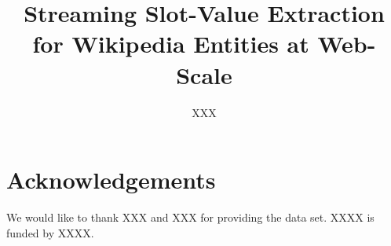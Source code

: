 \documentclass[letterpaper]{article}
\newcommand\hide[2]{#2}
\begin{document}
\title{Streaming Slot-Value Extraction for Wikipedia Entities at Web-Scale}





\author{XXX}



\maketitle







%







\section*{Acknowledgements}
We would like to thank \hide{John Frank}{XXX} and \hide{NIST}{XXX} for providing the data set.
\hide{Christan Grant}{XXXX} is funded by \hide{a National Science Foundation Graduate Research Fellowship under Grant No. DGE-0802270}{XXXX}. 

%
%




%
\end{document}
